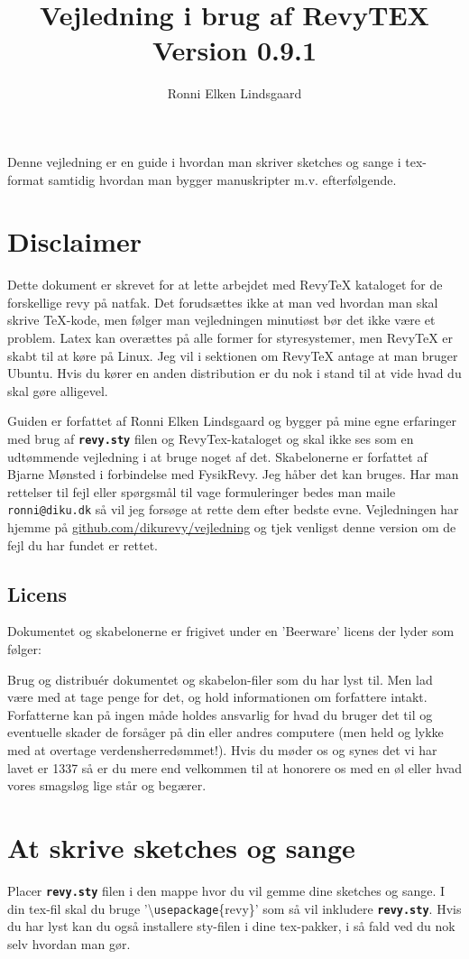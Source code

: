 \documentclass{article}
\title{Vejledning i brug af RevyTEX\\Version 0.9.1}
\author{Ronni Elken Lindsgaard}
\newcommand{\fname}[1]{\textbf{\texttt{#1}}}
\newcommand{\cmd}[1]{\textbackslash \texttt{#1}}
\begin{document}
\maketitle
Denne vejledning er en guide i hvordan man skriver sketches og sange i
tex-format samtidig hvordan man bygger manuskripter m.v. efterfølgende.
\section{Disclaimer}
Dette dokument er skrevet for at lette arbejdet med RevyTeX kataloget
for de forskellige revy på natfak. Det forudsættes ikke at man ved
hvordan man skal skrive TeX-kode, men følger man vejledningen
minutiøst bør det ikke være et problem. Latex kan overættes på alle
former for styresystemer, men RevyTeX er skabt til at køre på Linux.
Jeg vil i sektionen om RevyTeX antage at man bruger Ubuntu. Hvis du
kører en anden distribution er du nok i stand til at vide hvad du skal
gøre alligevel.

Guiden er forfattet af Ronni Elken Lindsgaard og bygger på mine egne
erfaringer med brug af \fname{revy.sty} filen og RevyTex-kataloget og
skal ikke ses som en udtømmende vejledning i at bruge noget af det.
Skabelonerne er forfattet af Bjarne Mønsted i forbindelse med FysikRevy.
Jeg håber det kan bruges. Har man rettelser til fejl eller spørgsmål til
vage formuleringer bedes man maile
\texttt{ronni@diku.dk} så vil jeg forsøge at rette dem efter bedste
evne. Vejledningen har hjemme på \url{github.com/dikurevy/vejledning} og
tjek venligst denne version om de fejl du har fundet er rettet.

\subsection{Licens}
Dokumentet og skabelonerne er frigivet under en 'Beerware' licens der
lyder som følger:

Brug og distribuér dokumentet og skabelon-filer som du har lyst til. Men
lad være med at tage penge for det, og hold informationen om forfattere
intakt. Forfatterne kan
på ingen måde holdes ansvarlig for hvad du bruger det til og eventuelle
skader de forsåger på din eller andres computere (men held og lykke med
at overtage verdensherredømmet!). Hvis du
møder os og synes det vi har lavet er 1337 så er du mere end velkommen
til at honorere os med en øl eller hvad vores smagsløg lige står og
begærer.

\section{At skrive sketches og sange}
Placer \fname{revy.sty} filen i den mappe hvor du vil gemme dine
sketches og sange. I din tex-fil skal du bruge '\cmd{usepackage}\{revy\}' som
så vil inkludere \fname{revy.sty}. Hvis du har lyst kan du også installere
sty-filen i dine tex-pakker, i så fald ved du nok selv hvordan man gør.
\end{document}
